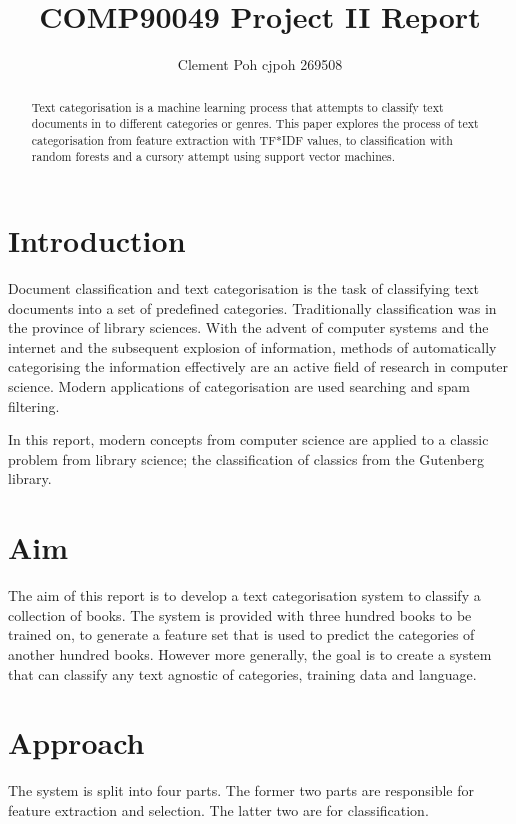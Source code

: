 \documentclass[11pt]{article}
\title{COMP90049 Project II Report}
\author{Clement Poh cjpoh 269508}
\begin{document}
\maketitle


\begin{abstract}
Text categorisation is a machine learning process that attempts to classify text
documents in to different categories or genres. This paper explores the process
of text categorisation from feature extraction with TF*IDF values, to
classification with random forests and a cursory attempt using support vector
machines.
\end{abstract}


\section{Introduction}

Document classification and text categorisation is the task of classifying text
documents into a set of predefined categories. Traditionally classification was
in the province of library sciences. With the advent of computer systems and the
internet and the subsequent explosion of information, methods of automatically
categorising the information effectively are an active field of research in
computer science. Modern applications of categorisation are used searching and
spam filtering.

In this report, modern concepts from computer science are applied to a classic
problem from library science; the classification of classics from the Gutenberg
library.

\section{Aim}

The aim of this report is to develop a text categorisation system to classify a
collection of books. The system is provided with three hundred books to be
trained on, to generate a feature set that is used to predict the categories of
another hundred books. However more generally, the goal is to create a system
that can classify any text agnostic of categories, training data and language.

\section{Approach}

The system is split into four parts. The former two parts are responsible for
feature extraction and selection. The latter two are for classification.
\end{document}

